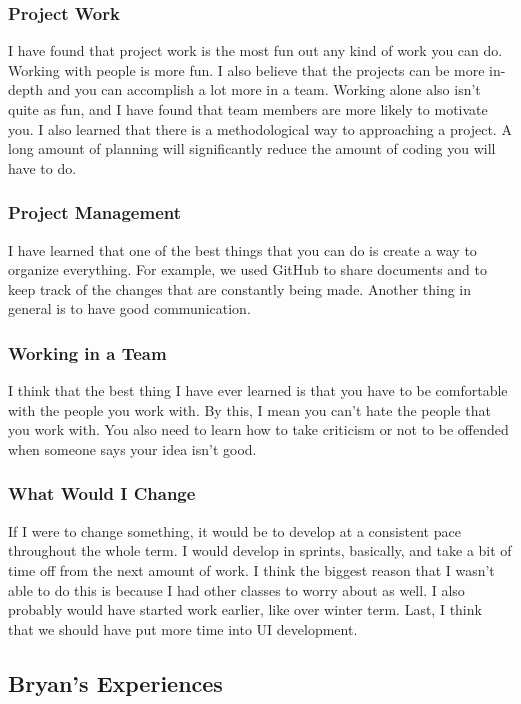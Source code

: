 \documentclass[journal,compsoc, 10pt, draftclsnofoot, onecolumn]{IEEEtran}
\begin{document}
\subsubsection{Project Work}
I have found that project work is the most fun out any kind of work you can do.
Working with people is more fun. I also believe that the projects can be more 
in-depth and you can accomplish a lot more in a team. Working alone also isn't 
quite as fun, and I have found that team members are more likely to motivate 
you. I also learned that there is a methodological way to approaching a project.
A long amount of planning will significantly reduce the amount of coding you will 
have to do.

\subsubsection{Project Management}
I have learned that one of the best things that you can do is create a way to 
organize everything. For example, we used GitHub to share documents and to 
keep track of the changes that are constantly being made. Another thing in 
general is to have good communication. 

\subsubsection{Working in a Team}
I think that the best thing I have ever learned is that you have to be comfortable 
with the people you work with. By this, I mean you can't hate the people that you 
work with. You also need to learn how to take criticism or not to be offended when 
someone says your idea isn't good.

\subsubsection{What Would I Change}
If I were to change something, it would be to develop at a consistent pace 
throughout the whole term. I would develop in sprints, basically, and take a 
bit of time off from the next amount of work. I think the biggest reason that I 
wasn't able to do this is because I had other classes to worry about as well. I 
also probably would have started work earlier, like over winter term. Last, I 
think that we should have put more time into UI development.

\subsection{Bryan's Experiences}
\end{document}
